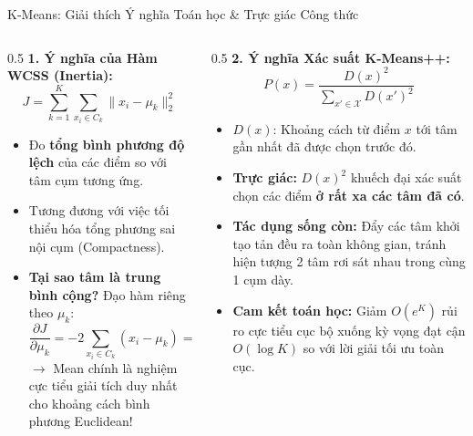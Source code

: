 \documentclass[aspectratio=169,10pt]{beamer}
\begin{document}
\begin{frame}{K-Means: Giải thích Ý nghĩa Toán học \& Trực giác Công thức}
  \footnotesize
  \begin{columns}[T]
    \begin{column}{0.5\textwidth}
      \textbf{1. Ý nghĩa của Hàm WCSS (Inertia):}
      $$J = \sum_{k=1}^K \sum_{x_i \in C_k} \|x_i - \mu_k\|_2^2$$
      \begin{itemize}\setlength{\itemsep}{1.5pt}
        \item Đo \textbf{tổng bình phương độ lệch} của các điểm so với tâm cụm tương ứng.
        \item Tương đương với việc tối thiểu hóa tổng phương sai nội cụm (Compactness).
        \item \textbf{Tại sao tâm là trung bình cộng?} Đạo hàm riêng theo $\mu_k$:
          $$\frac{\partial J}{\partial \mu_k} = -2\sum_{x_i \in C_k} (x_i - \mu_k) = 0 \implies \mu_k = \frac{1}{|C_k|}\sum_{x_i \in C_k} x_i$$
          $\to$ Mean chính là nghiệm cực tiểu giải tích duy nhất cho khoảng cách bình phương Euclidean!
      \end{itemize}
    \end{column}
    \begin{column}{0.5\textwidth}
      \textbf{2. Ý nghĩa Xác suất K-Means++:}
      $$P(x) = \frac{D(x)^2}{\sum_{x' \in \mathcal{X}} D(x')^2}$$
      \begin{itemize}\setlength{\itemsep}{1.5pt}
        \item $D(x)$: Khoảng cách từ điểm $x$ tới tâm gần nhất đã được chọn trước đó.
        \item \textbf{Trực giác:} $D(x)^2$ khuếch đại xác suất chọn các điểm \textbf{ở rất xa các tâm đã có}.
        \item \textbf{Tác dụng sống còn:} Đẩy các tâm khởi tạo tản đều ra toàn không gian, tránh hiện tượng 2 tâm rơi sát nhau trong cùng 1 cụm dày.
        \item \textbf{Cam kết toán học:} Giảm $O(e^K)$ rủi ro cực tiểu cục bộ xuống kỳ vọng đạt cận $O(\log K)$ so với lời giải tối ưu toàn cục.
      \end{itemize}
    \end{column}
  \end{columns}
\end{frame}
\end{document}

